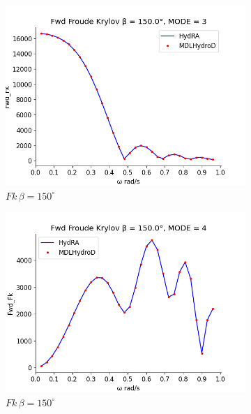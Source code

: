 \begin{figure}[H]
    \vspace{5pt}%
    \begin{subfigure}[b]{0.49\textwidth}
        \includegraphics[width=\textwidth]{plots/kvlcc/fk/fk3.png}
        \caption{$Fk \, \beta = 150^{\circ}$}
    \end{subfigure}
    \begin{subfigure}[b]{0.49\textwidth}
        \includegraphics[width=\textwidth]{plots/kvlcc/fk/fk4.png}
        \caption{$Fk \, \beta = 150^{\circ}$}
    \end{subfigure}
    \vspace{5pt}%
    \begin{subfigure}[b]{0.49\textwidth}

\end{subfigure}
\end{figure}
